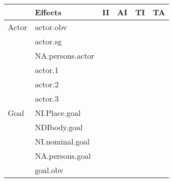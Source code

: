 \begin{table}[]
\begin{tabular}{@{}llllll@{}}
\toprule
               & Effects          & II                                                       & AI                                                       & TI                                                       & TA                                                       \\ \midrule
Actor          & actor.obv        &                      & \cellcolor[HTML]{EA9999}{ CNJ}       &                      & \cellcolor[HTML]{EA9999}{ CNJ}       \\
               & actor.sg         &                      & \cellcolor[HTML]{EA9999}{ CNJ}       &                      & \cellcolor[HTML]{B6D7A8}{ CNJ}       \\
               & NA.persons.actor &                      &                                                          & \cellcolor[HTML]{B6D7A8}{ IND}       &                      \\
               & actor.1          &                      &                                                          &                      & \cellcolor[HTML]{B6D7A8}{ IND}       \\
               & actor.2          &                      &                                                          & \cellcolor[HTML]{B6D7A8}{ IND}       &                      \\
               & actor.3          &                      &                                                          & \cellcolor[HTML]{EA9999}{ CNJ}       &                      \\
\midrule
Goal           & NI.Place.goal    &                      &                                            & \cellcolor[HTML]{EA9999}{ CNJ}       &                      \\
               & NDIbody.goal     &                      &                                            & \cellcolor[HTML]{EA9999}{ CNJ}       &                      \\
               & NI.nominal.goal  &                      &                                            & \cellcolor[HTML]{EA9999}{ CNJ}       &                      \\
               & NA.persons.goal  &                      &                                            &                      & \cellcolor[HTML]{EA9999}{ CNJ}       \\
               & goal.obv         &                      &                                            &                      & \cellcolor[HTML]{EA9999}{ CNJ}       \\

\end{tabular}
\end{table}
